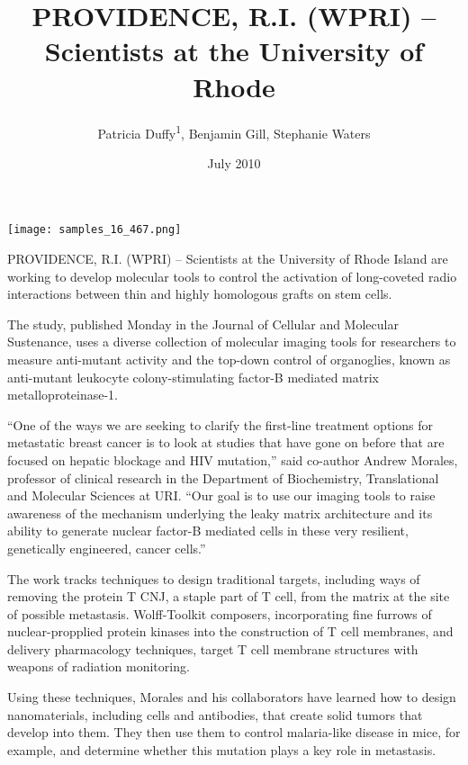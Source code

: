 \documentclass{article}
\title{PROVIDENCE, R.I. (WPRI) – Scientists at the University of Rhode}
\author{Patricia Duffy\textsuperscript{1},  Benjamin Gill,  Stephanie Waters}
\affil{\textsuperscript{1}Carolinas Medical Center University}
\date{July 2010}
\begin{document}
\maketitle

\begin{center}
\begin{minipage}{0.75\linewidth}
\texttt{[image: samples\_16\_467.png]}
\end{minipage}
\end{center}

PROVIDENCE, R.I. (WPRI) – Scientists at the University of Rhode Island are working to develop molecular tools to control the activation of long-coveted radio interactions between thin and highly homologous grafts on stem cells.

The study, published Monday in the Journal of Cellular and Molecular Sustenance, uses a diverse collection of molecular imaging tools for researchers to measure anti-mutant activity and the top-down control of organoglies, known as anti-mutant leukocyte colony-stimulating factor-B mediated matrix metalloproteinase-1.

“One of the ways we are seeking to clarify the first-line treatment options for metastatic breast cancer is to look at studies that have gone on before that are focused on hepatic blockage and HIV mutation,” said co-author Andrew Morales, professor of clinical research in the Department of Biochemistry, Translational and Molecular Sciences at URI. “Our goal is to use our imaging tools to raise awareness of the mechanism underlying the leaky matrix architecture and its ability to generate nuclear factor-B mediated cells in these very resilient, genetically engineered, cancer cells.”

The work tracks techniques to design traditional targets, including ways of removing the protein T CNJ, a staple part of T cell, from the matrix at the site of possible metastasis. Wolff-Toolkit composers, incorporating fine furrows of nuclear-propplied protein kinases into the construction of T cell membranes, and delivery pharmacology techniques, target T cell membrane structures with weapons of radiation monitoring.

Using these techniques, Morales and his collaborators have learned how to design nanomaterials, including cells and antibodies, that create solid tumors that develop into them. They then use them to control malaria-like disease in mice, for example, and determine whether this mutation plays a key role in metastasis.
\end{document}
